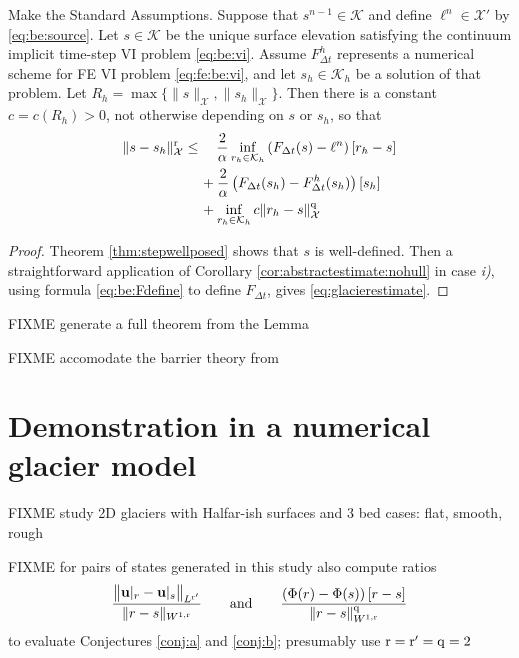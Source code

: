 \documentclass[hidelinks,onefignum,onetabnum,final]{siamart220329}  %
\newcommand{\bu}{\mathbf{u}}
\newcommand{\cK}{\mathcal{K}}
\newcommand{\cX}{\mathcal{X}}
\newcommand{\qq}{{\text{\textnormal{q}}}}
\newcommand{\rr}{{\text{\textnormal{r}}}}
\begin{document}
\begin{lemma} \label{lem:preglacierapp}  Make the Standard Assumptions.  Suppose that $s^{n-1}\in\cK$ and define $\ell^n \in \cX'$ by \eqref{eq:be:source}.  Let $s\in\cK$ be the unique surface elevation satisfying the continuum implicit time-step VI problem \eqref{eq:be:vi}.  Assume $F^h_{\Delta t}$ represents a numerical scheme for FE VI problem \eqref{eq:fe:be:vi}, and let $s_h\in\cK_h$ be a solution of that problem.  Let $R_h=\max\{\|s\|_\cX,\|s_h\|_\cX\}$.  Then there is a constant $c=c(R_h)>0$, not otherwise depending on $s$ or $s_h$, so that
\begin{align}
\|s-s_h\|_\cX^\rr &\le \quad \frac{2}{\alpha} \inf_{r_h\in\cK_h} \left(F_{\Delta t}(s)-\ell^n\right)[r_h-s] \label{eq:glacierestimate} \\
   &\quad\, + \frac{2}{\alpha} \left(F_{\Delta t}(s_h)-F^h_{\Delta t}(s_h)\right)[s_h] \notag \\
   &\quad\, + \inf_{r_h\in\cK_h} c \|r_h - s\|_{\cX}^\qq \notag
\end{align}
\end{lemma}

\begin{proof}
Theorem \ref{thm:stepwellposed} shows that $s$ is well-defined.  Then a straightforward application of Corollary \ref{cor:abstractestimate:nohull} in case \emph{i)}, using formula \eqref{eq:be:Fdefine} to define $F_{\Delta t}$, gives \eqref{eq:glacierestimate}.
\end{proof}

FIXME generate a full theorem from the Lemma

FIXME accomodate the barrier theory from \cite{Bueler2021conservation}


\section{Demonstration in a numerical glacier model} \label{sec:demo}

FIXME study 2D glaciers with Halfar-ish surfaces and 3 bed cases: flat, smooth, rough

FIXME for pairs of states generated in this study also compute ratios
\begin{equation}
\frac{\big\|\bu|_r - \bu|_s\big\|_{L^{\rr'}}}{\|r-s\|_{W^{1,\rr}}} \qquad \text{and} \qquad \frac{\left(\Phi(r) - \Phi(s)\right)[r-s]}{\|r-s\|_{W^{1,\rr}}^\qq}
\end{equation}
to evaluate Conjectures \ref{conj:a} and \ref{conj:b}; presumably use $\rr=\rr'=\qq=2$
\end{document}
